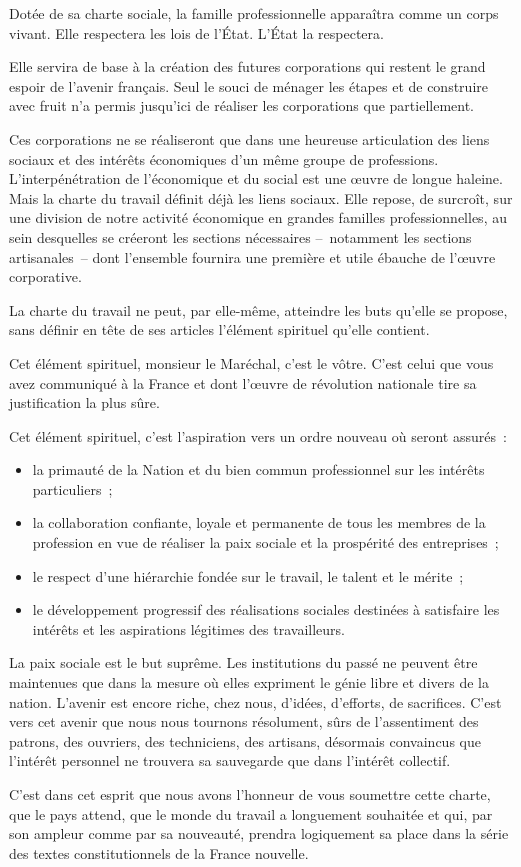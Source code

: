 \documentclass[french,twoside]{book} %
\begin{document}
Dotée de sa charte sociale, la famille professionnelle apparaîtra comme un corps vivant. Elle respectera les lois de l’État. L’État la respectera.\par
Elle servira de base à la création des futures corporations qui restent le grand espoir de l’avenir français. Seul le souci de ménager les étapes et de construire avec fruit n’a permis jusqu’ici de réaliser les corporations que partiellement.\par
Ces corporations ne se réaliseront que dans une heureuse articulation des liens sociaux et des intérêts économiques d’un même groupe de professions. L’interpénétration de l’économique et du social est une œuvre de longue haleine. Mais la charte du travail définit déjà les liens sociaux. Elle repose, de surcroît, sur une division de notre activité économique en grandes familles professionnelles, au sein desquelles se créeront les sections nécessaires – notamment les sections artisanales – dont l’ensemble fournira une première et utile ébauche de l’œuvre corporative.\par
La charte du travail ne peut, par elle-même, atteindre les buts qu’elle se propose, sans définir en tête de ses articles l’élément spirituel qu’elle contient.\par
Cet élément spirituel, monsieur le Maréchal, c’est le vôtre. C’est celui que vous avez communiqué à la France et dont l’œuvre de révolution nationale tire sa justification la plus sûre.\par
Cet élément spirituel, c’est l’aspiration vers un ordre nouveau où seront assurés :\par

\begin{itemize}[itemsep=0pt,]
\item la primauté de la Nation et du bien commun professionnel sur les intérêts particuliers ;
\item la collaboration confiante, loyale et permanente de tous les membres de la profession en vue de réaliser la paix sociale et la prospérité des entreprises ;
\item le respect d’une hiérarchie fondée sur le travail, le talent et le mérite ;
\item le développement progressif des réalisations sociales destinées à satisfaire les intérêts et les aspirations légitimes des travailleurs.
\end{itemize}

\noindent La paix sociale est le but suprême. Les institutions du passé ne peuvent être maintenues que dans la mesure où elles expriment le génie libre et divers de la nation. L’avenir est encore riche, chez nous, d’idées, d’efforts, de sacrifices. C’est vers cet avenir que nous nous tournons résolument, sûrs de l’assentiment des patrons, des ouvriers, des techniciens, des artisans, désormais convaincus que l’intérêt personnel ne trouvera sa sauvegarde que dans l’intérêt collectif.\par
C’est dans cet esprit que nous avons l’honneur de vous soumettre cette charte, que le pays attend, que le monde du travail a longuement souhaitée et qui, par son ampleur comme par sa nouveauté, prendra logiquement sa place dans la série des textes constitutionnels de la France nouvelle.
\end{document}
